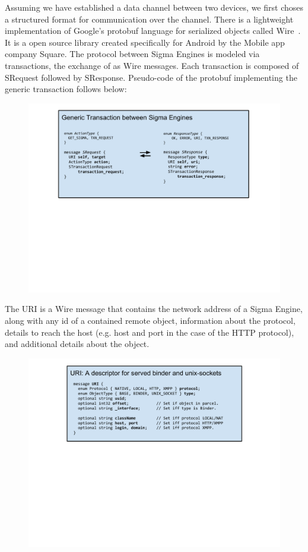 \documentclass[prodmode]{acmlarge}
\begin{document}
Assuming we have established a data channel between two devices, we first choses a structured format for communication over the channel. There is a lightweight implementation of Google's protobuf language for serialized objects called Wire~\cite{Wire,IntroWire}. It is a open source library created specifically for Android by the Mobile app company Square. The protocol between Sigma Engines is modeled via transactions, the exchange of as Wire messages. Each transaction is composed of SRequest followed by SResponse. Pseudo-code of the protobuf implementing the generic transaction follows below:

\begin{figure}[h!]
\centering
\includegraphics[width=\columnwidth]{drawings/WireTransaction.pdf}
\end{figure}

The URI is a Wire message that contains the network address of a Sigma Engine, along with any id of a contained remote object, information about the protocol, details to reach the host (e.g. host and port in the case of the HTTP protocol), and additional details about the object.

\begin{figure}[h!]
\centering
\includegraphics[width=\columnwidth]{drawings/WireURI.pdf}
\end{figure}
\end{document}
